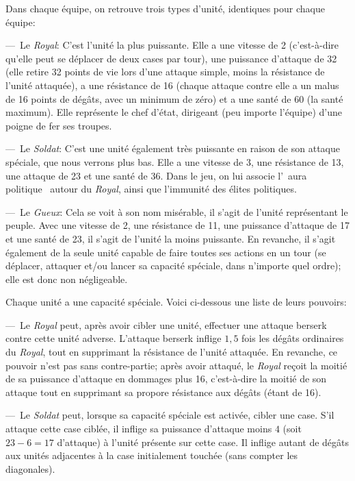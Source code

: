 \documentclass[11pt, a4paper, oneside, portrait]{article}
\begin{document}
            Dans chaque équipe, on retrouve trois types d'unité, identiques pour chaque équipe:

            ---~Le \emph{Royal}: C'est l'unité la plus puissante.
            Elle a une vitesse de 2 (c'est-à-dire qu'elle peut se déplacer de deux cases par tour), une puissance d'attaque de 32 (elle retire 32 points de vie lors d'une attaque simple, moins la résistance de l'unité attaquée), a une résistance de 16 (chaque attaque contre elle a un malus de 16 points de dégâts, avec un minimum de zéro) et a une santé de 60 (la santé maximum).
            Elle représente le chef d'état, dirigeant (peu importe l'équipe) d'une poigne de fer ses troupes.

            ---~Le \emph{Soldat}: C'est une unité également très puissante en raison de son attaque spéciale, que nous verrons plus bas.
            Elle a une vitesse de 3, une résistance de 13, une attaque de 23 et une santé de 36.
            Dans le jeu, on lui associe l'\guillemotleft{}~aura politique~\guillemotright{} autour du \emph{Royal}, ainsi que l'immunité des élites politiques.

            ---~Le \emph{Gueux}: Cela se voit à son nom misérable, il s'agit de l'unité représentant le peuple.
            Avec une vitesse de 2, une résistance de 11, une puissance d'attaque de 17 et une santé de 23, il s'agit de l'unité la moins puissante.
            En revanche, il s'agit également de la seule unité capable de faire toutes ses actions en un tour (se déplacer, attaquer et/ou lancer sa capacité spéciale, dans n'importe quel ordre); elle est donc non négligeable.

            Chaque unité a une capacité spéciale.
            Voici ci-dessous une liste de leurs pouvoirs:

            ---~Le \emph{Royal} peut, après avoir cibler une unité, effectuer une attaque berserk contre cette unité adverse.
            L'attaque berserk inflige $1,5$ fois les dégâts ordinaires du \emph{Royal}, tout en supprimant la résistance de l'unité attaquée.
            En revanche, ce pouvoir n'est pas sans contre-partie; après avoir attaqué, le \emph{Royal} reçoit la moitié de sa puissance d'attaque en dommages plus 16, c'est-à-dire la moitié de son attaque tout en supprimant sa propore résistance aux dégâts (étant de 16).

            ---~Le \emph{Soldat} peut, lorsque sa capacité spéciale est activée, cibler une case.
            S'il attaque cette case ciblée, il inflige sa puissance d'attaque moins $4$ (soit $23-6=17$ d'attaque) à l'unité présente sur cette case. Il inflige autant de dégâts aux unités adjacentes à la case initialement touchée (sans compter les diagonales).
\end{document}
